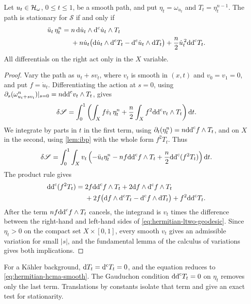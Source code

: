 \begin{theorem}\label{thm:hermitian-ltwo-stationarity}
Let $u_t\in\mathcal H_\omega$, $0\leq t\leq1$, be a smooth path, and put $\eta_t=\omega_{u_t}$ and $T_t=\eta_t^{n-1}$. The path is stationary for $\mathscr S$ if and only if
\begin{equation}\label{eq:hermitian-ltwo-geodesic}
 \begin{split}
 \ddot u_t\,\eta_t^n={}&n\,\mathrm{d}\dot u_t\wedge\mathrm d^{\mathrm c}\dot u_t\wedge T_t\\
 &+n\dot u_t\bigl(\mathrm{d}\dot u_t\wedge\mathrm d^{\mathrm c} T_t
                  -\mathrm d^{\mathrm c}\dot u_t\wedge \mathrm{d}T_t\bigr)
   +\frac n2\dot u_t^{\,2}\mathrm{dd}^{\mathrm{c}} T_t.
 \end{split}
\end{equation}
All differentials on the right act only in the $X$ variable.
\end{theorem}
\begin{proof}
Vary the path as $u_t+s v_t$, where $v_t$ is smooth in $(x,t)$ and $v_0=v_1=0$, and put $f=\dot u_t$. Differentiating the action at $s=0$, using $\partial_s(\omega_{u_t+sv_t}^n)|_{s=0}=n\mathrm{dd}^{\mathrm{c}} v_t\wedge T_t$, gives
\[
 \delta\mathscr S
 =\int_0^1\left(\int_X f\dot v_t\,\eta_t^n
       +\frac n2\int_X f^2\mathrm{dd}^{\mathrm{c}} v_t\wedge T_t\right)\mathrm{d}t.
\]
We integrate by parts in $t$ in the first term, using
$\partial_t(\eta_t^n)=n\mathrm{dd}^{\mathrm{c}} f\wedge T_t$, and on $X$ in the second, using \cref{lem:ibp} with the whole form $f^2T_t$. Thus
\[
 \delta\mathscr S
 =\int_0^1\int_Xv_t\left(-\ddot u_t\eta_t^n
       -nf\mathrm{dd}^{\mathrm{c}} f\wedge T_t+\frac n2\mathrm{dd}^{\mathrm{c}}(f^2T_t)\right)\mathrm{d}t.
\]
The product rule gives
\[
 \begin{split}
 \mathrm{dd}^{\mathrm{c}}(f^2T_t)={}&2f\mathrm{dd}^{\mathrm{c}} f\wedge T_t
       +2\mathrm{d}f\wedge\mathrm d^{\mathrm c} f\wedge T_t\\
 &+2f\bigl(\mathrm{d}f\wedge\mathrm d^{\mathrm c} T_t-\mathrm d^{\mathrm c} f\wedge \mathrm{d}T_t\bigr)
       +f^2\mathrm{dd}^{\mathrm{c}} T_t.
 \end{split}
\]
After the term $nf\mathrm{dd}^{\mathrm{c}} f\wedge T_t$ cancels, the integrand is $v_t$ times the difference between the right-hand and left-hand sides of \eqref{eq:hermitian-ltwo-geodesic}. Since $\eta_t>0$ on the compact set $X\times[0,1]$, every smooth $v_t$ gives an admissible variation for small $|s|$, and the fundamental lemma of the calculus of variations gives both implications.
\end{proof}

For a K\"ahler background, $\mathrm{d}T_t=\mathrm d^{\mathrm c} T_t=0$, and the equation reduces to \eqref{eq:hermitian-hcma-smooth}. The Gauduchon condition $\mathrm{dd}^{\mathrm{c}} T_t=0$ on $\eta_t$ removes only the last term. Translations by constants isolate that term and give an exact test for stationarity.

